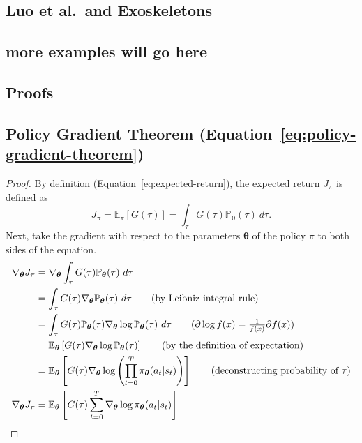 \documentclass[12pt]{report}
\theoremstyle{definition}
\theoremstyle{remark}
\begin{document}
\cite{hutter_legged_2022}
\cite{lee_learning_2020}

\section{Luo et al.\ and Exoskeletons}
\cite{luo_reinforcement_2021}
\cite{luo_experiment-free_2024}


\section{more examples will go here}


\begin{appendices}
\chapter{Proofs}
\section{Policy Gradient Theorem (Equation~\ref{eq:policy-gradient-theorem})}\label{sec:policy-gradient-theorem-proof}
\begin{proof}
    By definition (Equation~\ref{eq:expected-return}), the expected return $J_\pi$ is defined as
    \begin{equation*}
        J_\pi = \mathbb{E}_\pi[G(\tau)] = \int_{\tau} G(\tau)\mathbb{P}_{\boldsymbol{\theta}}(\tau)\ d\tau.
    \end{equation*}
    Next, take the gradient with respect to the parameters $\boldsymbol{\theta}$ of the policy $\pi$ to both sides of the equation.
    \begin{align*}
        \nabla_{\boldsymbol{\theta}} J_\pi &= \nabla_{\boldsymbol{\theta}} \int_{\tau} G(\tau)\mathbb{P}_{\boldsymbol{\theta}}(\tau)\ d\tau \\
        &= \int_{\tau} G(\tau) \nabla_{\boldsymbol{\theta}} \mathbb{P}_{\boldsymbol{\theta}}(\tau)\ d\tau \tag{by Leibniz integral rule} \\
        &= \int_{\tau} G(\tau) \mathbb{P}_{\boldsymbol{\theta}}(\tau) \nabla_{\boldsymbol{\theta}} \log \mathbb{P}_{\boldsymbol{\theta}}(\tau)\ d\tau \tag{$\partial \log f(x) = \frac{1}{f(x)}\partial f(x)$} \\
        &= \mathbb{E}_{\boldsymbol{\theta}}\left[G(\tau) \nabla_{\boldsymbol{\theta}} \log \mathbb{P}_{\boldsymbol{\theta}}(\tau)\right] \tag{by the definition of expectation} \\
        &= \mathbb{E}_{\boldsymbol{\theta}}\left[G(\tau) \nabla_{\boldsymbol{\theta}} \log \left(\prod_{t=0}^{T} \pi_{\boldsymbol{\theta}}(a_t | s_t)\right)\right] \tag{deconstructing probability of $\tau$} \\
        \nabla_{\boldsymbol{\theta}} J_\pi &= \mathbb{E}_{\boldsymbol{\theta}}\left[G(\tau) \sum_{t=0}^{T} \nabla_{\boldsymbol{\theta}} \log \pi_{\boldsymbol{\theta}}(a_t | s_t)\right]
    \end{align*}
\end{proof}
\end{appendices}







\nocite{*} %

\printglossaries

\printbibliography
{}
\end{document}
